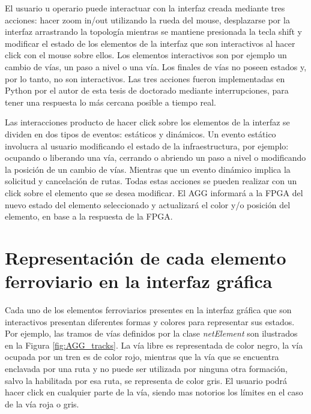 	El usuario u operario puede interactuar con la interfaz creada mediante tres acciones: hacer zoom in/out utilizando la rueda del mouse, desplazarse por la interfaz arrastrando la topología mientras se mantiene presionada la tecla shift y modificar el estado de los elementos de la interfaz que son interactivos al hacer click con el mouse sobre ellos. Los elementos interactivos son por ejemplo un cambio de vías, un paso a nivel o una vía. Los finales de vías no poseen estados y, por lo tanto, no son interactivos. Las tres acciones fueron implementadas en Python por el autor de esta tesis de doctorado mediante interrupciones, para tener una respuesta lo más cercana posible a tiempo real. 
	
	Las interacciones producto de hacer click sobre los elementos de la interfaz se dividen en dos tipos de eventos: estáticos y dinámicos. Un evento estático involucra al usuario modificando el estado de la infraestructura, por ejemplo: ocupando o liberando una vía, cerrando o abriendo un paso a nivel o modificando la posición de un cambio de vías. Mientras que un evento dinámico implica la solicitud y cancelación de rutas. Todas estas acciones se pueden realizar con un click sobre el elemento que se desea modificar. El AGG informará a la FPGA del nuevo estado del elemento seleccionado y actualizará el color y/o posición del elemento, en base a la respuesta de la FPGA. 
	
	\section{Representación de cada elemento ferroviario en la interfaz gráfica}
	\label{sec:AGG_STATUS}
	
	Cada uno de los elementos ferroviarios presentes en la interfaz gráfica que son interactivos presentan diferentes formas y colores para representar sus estados. Por ejemplo, las tramos de vías definidos por la clase \textit{netElement} son ilustrados en la Figura \ref{fig:AGG_tracks}. La vía libre es representada de color negro, la vía ocupada por un tren es de color rojo, mientras que la vía que se encuentra enclavada por una ruta y no puede ser utilizada por ninguna otra formación, salvo la habilitada por esa ruta, se representa de color gris. El usuario podrá hacer click en cualquier parte de la vía, siendo mas notorios los límites en el caso de la vía roja o gris.
		
